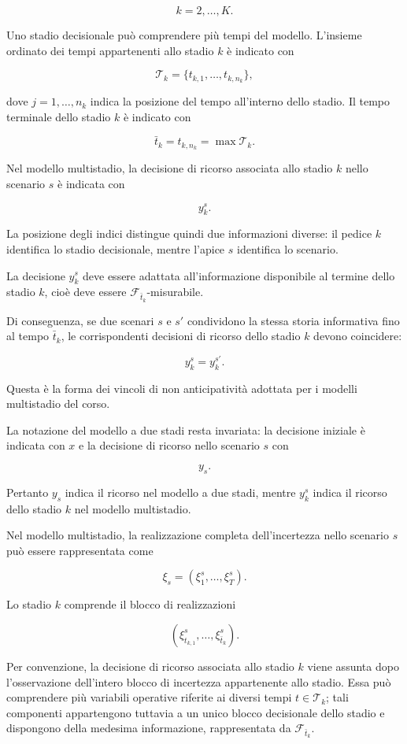 \documentclass[12pt,a4paper]{article}
\newcommand{\1}{\mathbf{1}}
\begin{document}
\[
k=2,\ldots,K.
\]

Uno stadio decisionale pu\`o comprendere pi\`u tempi del modello. L'insieme
ordinato dei tempi appartenenti allo stadio $k$ \`e indicato con

\[
\mathcal T_k
=
\{t_{k,1},\ldots,t_{k,n_k}\},
\]

dove $j=1,\ldots,n_k$ indica la posizione del tempo all'interno dello
stadio. Il tempo terminale dello stadio $k$ \`e indicato con

\[
\bar t_k
=
t_{k,n_k}
=
\max\mathcal T_k.
\]

Nel modello multistadio, la decisione di ricorso associata allo stadio $k$
nello scenario $s$ \`e indicata con

\[
y_k^s.
\]

La posizione degli indici distingue quindi due informazioni diverse:
il pedice $k$ identifica lo stadio decisionale, mentre l'apice $s$
identifica lo scenario.

La decisione $y_k^s$ deve essere adattata all'informazione disponibile al
termine dello stadio $k$, cio\`e deve essere
$\mathcal F_{\bar t_k}$-misurabile.

Di conseguenza, se due scenari $s$ e $s'$ condividono la stessa storia
informativa fino al tempo $\bar t_k$, le corrispondenti decisioni di
ricorso dello stadio $k$ devono coincidere:

\[
y_k^s=y_k^{s'}.
\]

Questa \`e la forma dei vincoli di non anticipativit\`a adottata per i
modelli multistadio del corso.

La notazione del modello a due stadi resta invariata: la decisione iniziale
\`e indicata con $x$ e la decisione di ricorso nello scenario $s$ con

\[
y_s.
\]

Pertanto $y_s$ indica il ricorso nel modello a due stadi, mentre $y_k^s$
indica il ricorso dello stadio $k$ nel modello multistadio.

Nel modello multistadio, la realizzazione completa dell'incertezza nello
scenario $s$ pu\`o essere rappresentata come

\[
\xi_s
=
\left(
\xi_1^s,\ldots,\xi_T^s
\right).
\]

Lo stadio $k$ comprende il blocco di realizzazioni

\[
\left(
\xi_{t_{k,1}}^s,\ldots,\xi_{\bar t_k}^s
\right).
\]

Per convenzione, la decisione di ricorso associata allo stadio $k$ viene
assunta dopo l'osservazione dell'intero blocco di incertezza appartenente
allo stadio. Essa pu\`o comprendere pi\`u variabili operative riferite ai
diversi tempi $t\in\mathcal T_k$; tali componenti appartengono tuttavia a
un unico blocco decisionale dello stadio e dispongono della medesima
informazione, rappresentata da $\mathcal F_{\bar t_k}$.
\end{document}
